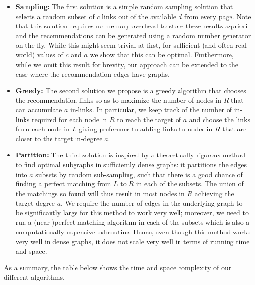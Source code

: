 \begin{itemize}

\item {\bf Sampling:} The first solution is a simple random sampling
  solution that selects a random subset of $c$ links out of the
  available $d$ from every page. Note that this solution requires no
  memory overhead to store these results a-priori and the
  recommendations can be generated using a random number generator on
  the fly. While this might seem trivial at first, for sufficient (and
  often real-world) values of $c$ and $a$ we show that this can be
  optimal. Furthermore, while we omit this result for brevity, our 
  approach can be extended to the case where the recommendation edges
  have graphs.

\item {\bf Greedy:} The second solution we propose is a greedy
  algorithm that chooses the recommendation links so as to maximize
  the number of nodes in $R$ that can accumulate $a$ in-links. In
  particular, we keep track of the number of in-links required for
  each node in $R$ to reach the target of $a$ and choose the links
  from each node in $L$ giving preference to adding links to nodes in
  $R$ that are closer to the target in-degree $a$.

\item {\bf Partition:} The third solution is inspired by a
  theoretically rigorous method to find optimal subgraphs in
  sufficiently dense graphs: it partitions the edges into $a$ subsets
  by random sub-sampling, such that there is a good chance of finding
  a perfect matching from $L$ to $R$ in each of the subsets. The union
  of the matchings so found will thus result in most nodes in $R$
  achieving the target degree $a$. We require the number of edges in
  the underlying graph to be significantly large for this method to
  work very well; moreover, we need to run a (near-)perfect matching
  algorithm in each of the subsets which is also a computationally
  expensive subroutine. Hence, even though this method works very well
  in dense graphs, it does not scale very well in terms of running
  time and space.
\end{itemize}

As a summary, the table below shows the time and space complexity
of our different algorithms.

